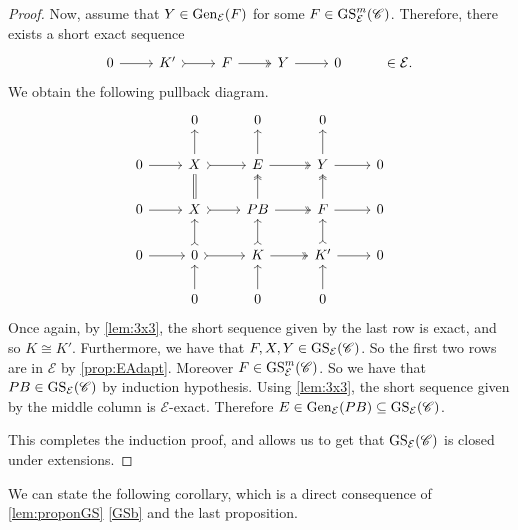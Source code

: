 \begin{proof}
Now, assume that $Y \in \operatorname{Gen}_\mathcal{E}(F)$ for some $F \in \operatorname{GS}_\mathcal{E}^m(\mathscr{C})$. Therefore, there exists a short exact sequence \[\begin{tikzcd}
	0 & K' & F  & Y &  0 & \in \mathcal{E}.
	\arrow[from=1-1, to=1-2]
	\arrow[tail, from=1-2, to=1-3]
	\arrow[two heads,from=1-3, to=1-4]
	\arrow[from=1-4, to=1-5]
\end{tikzcd} \] We obtain the following pullback diagram.
\[\begin{tikzcd}
         & 0 & 0 & 0 &  \\
	0 & X & E  & Y &  0 \\
     0 & X & PB & F & 0 \\
      0 & 0 & K & K' & 0 \\
       & 0 & 0 & 0 & 
	\arrow[from=2-1, to=2-2]
	\arrow[tail, from=2-2, to=2-3]
	\arrow[two heads,from=2-3, to=2-4]
	\arrow[from=2-4, to=2-5]
        \arrow[from=3-1, to=3-2]
	\arrow[tail, from=3-2, to=3-3]
	\arrow[two heads,from=3-3, to=3-4]
	\arrow[from=3-4, to=3-5]
        \arrow[from=4-1, to=4-2]
	\arrow[tail, from=4-2, to=4-3]
	\arrow[two heads,from=4-3, to=4-4]
	\arrow[from=4-4, to=4-5]
        \arrow[from=5-2, to=4-2]
	\arrow[tail, from=4-2, to=3-2]
	\arrow[equals,from=3-2, to=2-2]
	\arrow[from=2-2, to=1-2]
        \arrow[from=5-3, to=4-3]
	\arrow[tail, from=4-3, to=3-3]
	\arrow[two heads,from=3-3, to=2-3]
	\arrow[from=2-3, to=1-3]
        \arrow[from=5-4, to=4-4]
	\arrow[tail, from=4-4, to=3-4]
	\arrow[two heads,from=3-4, to=2-4]
	\arrow[from=2-4, to=1-4]
\end{tikzcd} \]
Once again, by \cref{lem:3x3}, the short sequence given by the last row is exact, and so $K \cong K'$. Furthermore, we have that $F,X,Y \in \operatorname{GS}_{\mathcal{E}}(\mathscr{C})$. So the first two rows are in $\mathcal{E}$ by \cref{prop:EAdapt}. Moreover $F \in \operatorname{GS}^{m}_{\mathcal{E}}(\mathscr{C})$. So we have that $PB \in \operatorname{GS}_{\mathcal{E}}(\mathscr{C})$ by induction hypothesis. Using \cref{lem:3x3}, the short sequence given by the middle column is ${\mathcal{E}}$-exact. Therefore $E \in \operatorname{Gen}_\mathcal{E}(PB) \subseteq \operatorname{GS}_{\mathcal{E}}(\mathscr{C})$. 

This completes the induction proof, and allows us to get that $\operatorname{GS}_\mathcal{E}(\mathscr{C})$ is closed under extensions.
\end{proof}

We can state the following corollary, which is a direct consequence of \cref{lem:proponGS} \ref{GSb} and the last proposition.

